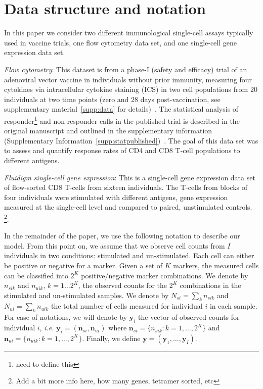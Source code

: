 \documentclass[11pt]{article}
\begin{document}
\section{Data structure and notation} 
In this paper we consider two different immunological single-cell assays typically used in vaccine trials, one flow cytometry data set, and one single-cell gene expression data set.

\textit{Flow cytometry}: This dataset is from a phase-I (safety and efficacy) trial of an adenoviral vector vaccine in individuals without prior immunity, measuring four cytokines via intracellular cytokine staining (ICS) in two cell populations from 20 individuals at two time points (zero and 28 days post-vaccination, see supplementary material~\ref{supp:data} for details)~\cite{Peiperl:2010ej}. The statistical analysis of responder\footnote{need to define this} and non-responder calls in the published trial is described in the original manuscript and outlined in the supplementary information (Supplementary Information~\ref{supp:statpublished})~\cite{Peiperl:2010ej}. The goal of this data set was to assess and quantify response rates of CD4 and CD8 T-cell populations to different antigens.

\textit{Fluidigm single-cell gene expression}: This is a single-cell gene expression data set of flow-sorted CD8 T-cells from sixteen individuals. The T-cells from blocks of four individuals were stimulated with different antigens, gene expression measured at the single-cell level and compared to paired, unstimulated controls. \footnote{Add a bit more info here, how many genes, tetramer sorted, etc}.

In the remainder of the paper, we use the following notation to describe our model. 
From this point on, we assume that we observe cell counts from $I$ individuals in two conditions: stimulated and un-stimulated. Each cell can either be positive or negative for a marker. Given a set of $K$ markers, the measured cells can be classified into $2^K$ positive/negative marker combinations. We denote by $n_{sik}$ and $n_{uik}$, $k=1\dots 2^K$, the observed counts for the $2^K$ combinations in the stimulated and un-stimulated samples. We denote by $N_{si}=\sum_k n_{sik}$ and $N_{ui}=\sum_k n_{uik}$ the total number of cells measured for individual $i$ in each sample. For ease of notations, we will denote by $\mathbf{y}_i$ the vector of observed counts for individual $i$, \textit{i.e.} $\mathbf{y}_{i}=(\mathbf{n}_{si}, \mathbf{n}_{ui})$ where $\mathbf{n}_{si}=\{n_{sik}: k=1,\dots,2^K\}$ and $\mathbf{n}_{ui}=\{n_{uik}: k=1,\dots,2^K\}$. Finally, we define $\mathbf{y}=(\mathbf{y}_1,\dots,\mathbf{y}_I)$.
\end{document}
